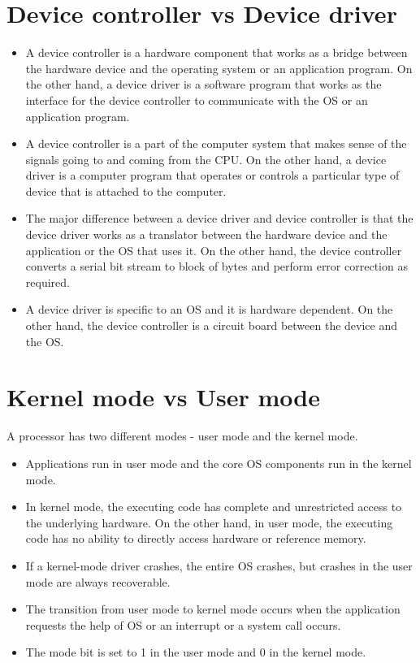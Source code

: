 \documentclass[]{report}
\begin{document}
\section{Device controller vs Device driver}
\begin{itemize}
	\item A device controller is a hardware component that works as a bridge between the hardware device and the operating system or an application program. On the other hand, a device driver is a software program that works as the interface for the device controller to communicate with the OS or an application program.
	\item A device controller is a part of the computer system that makes sense of the signals going to and coming from the CPU. On the other hand, a device driver is a computer program that operates or controls a particular type of device that is attached to the computer.
	\item The major difference between a device driver and device controller is that the device driver works as a translator between the hardware device and the application or the OS that uses it. On the other hand, the device controller converts a serial bit stream to block of bytes and perform error correction as required.
	\item A device driver is specific to an OS and it is hardware dependent. On the other hand, the device controller is a circuit board between the device and the OS.
\end{itemize}

\section{Kernel mode vs User mode}
A processor has two different modes - user mode and the kernel mode.
\begin{itemize}
	\item Applications run in user mode and the core OS components run in the kernel mode.
	\item In kernel mode, the executing code has complete and unrestricted access to the underlying hardware. On the other hand, in user mode, the executing code has no ability to directly access hardware or reference memory.
	\item If a kernel-mode driver crashes, the entire OS crashes, but crashes in the user mode are always recoverable.
	\item The transition from user mode to kernel mode occurs when the application requests the help of OS or an interrupt or a system call occurs.
	\item The mode bit is set to 1 in the user mode and 0 in the kernel mode.
\end{itemize}
\end{document}
